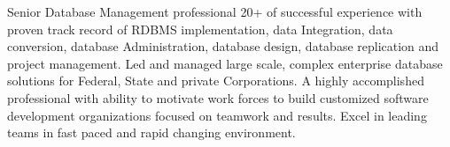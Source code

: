 \documentclass{resume}
\begin{document}


  
Senior Database Management professional 20+ of successful experience with proven track record of RDBMS implementation, data Integration, data conversion, database Administration, database design, database replication and project management. Led and managed large scale, complex enterprise database solutions for Federal, State and private Corporations. A highly accomplished professional with ability to motivate work forces to build customized software development organizations focused on teamwork and results. Excel in leading teams in fast paced and rapid changing environment.
\end{document}
